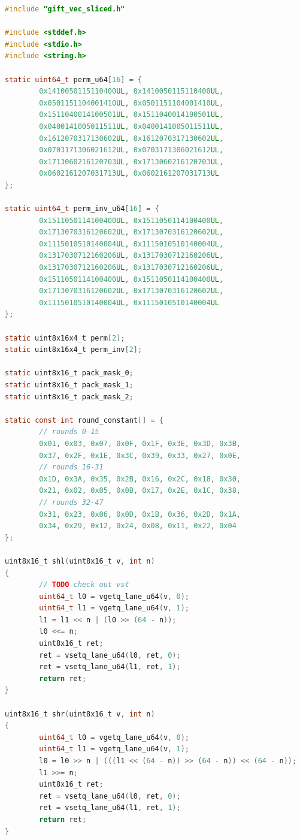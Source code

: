 \documentclass[12pt]{report}
\begin{document}
\begin{lstlisting}[language=c, caption={gift\_vec\_sliced.c}]
#include "gift_vec_sliced.h"

#include <stddef.h>
#include <stdio.h>
#include <string.h>

static uint64_t perm_u64[16] = {
        0x1410050115110400UL, 0x1410050115110400UL,
        0x0501151104001410UL, 0x0501151104001410UL,
        0x1511040014100501UL, 0x1511040014100501UL,
        0x0400141005011511UL, 0x0400141005011511UL,
        0x1612070317130602UL, 0x1612070317130602UL,
        0x0703171306021612UL, 0x0703171306021612UL,
        0x1713060216120703UL, 0x1713060216120703UL,
        0x0602161207031713UL, 0x0602161207031713UL
};

static uint64_t perm_inv_u64[16] = {
        0x1511050114100400UL, 0x1511050114100400UL,
        0x1713070316120602UL, 0x1713070316120602UL,
        0x1115010510140004UL, 0x1115010510140004UL,
        0x1317030712160206UL, 0x1317030712160206UL,
        0x1317030712160206UL, 0x1317030712160206UL,
        0x1511050114100400UL, 0x1511050114100400UL,
        0x1713070316120602UL, 0x1713070316120602UL,
        0x1115010510140004UL, 0x1115010510140004UL
};

static uint8x16x4_t perm[2];
static uint8x16x4_t perm_inv[2];

static uint8x16_t pack_mask_0;
static uint8x16_t pack_mask_1;
static uint8x16_t pack_mask_2;

static const int round_constant[] = {
        // rounds 0-15
        0x01, 0x03, 0x07, 0x0F, 0x1F, 0x3E, 0x3D, 0x3B,
        0x37, 0x2F, 0x1E, 0x3C, 0x39, 0x33, 0x27, 0x0E,
        // rounds 16-31
        0x1D, 0x3A, 0x35, 0x2B, 0x16, 0x2C, 0x18, 0x30,
        0x21, 0x02, 0x05, 0x0B, 0x17, 0x2E, 0x1C, 0x38,
        // rounds 32-47
        0x31, 0x23, 0x06, 0x0D, 0x1B, 0x36, 0x2D, 0x1A,
        0x34, 0x29, 0x12, 0x24, 0x08, 0x11, 0x22, 0x04
};

uint8x16_t shl(uint8x16_t v, int n)
{
        // TODO check out vst
        uint64_t l0 = vgetq_lane_u64(v, 0);
        uint64_t l1 = vgetq_lane_u64(v, 1);
        l1 = l1 << n | (l0 >> (64 - n));
        l0 <<= n;
        uint8x16_t ret;
        ret = vsetq_lane_u64(l0, ret, 0);
        ret = vsetq_lane_u64(l1, ret, 1);
        return ret;
}

uint8x16_t shr(uint8x16_t v, int n)
{
        uint64_t l0 = vgetq_lane_u64(v, 0);
        uint64_t l1 = vgetq_lane_u64(v, 1);
        l0 = l0 >> n | (((l1 << (64 - n)) >> (64 - n)) << (64 - n));
        l1 >>= n;
        uint8x16_t ret;
        ret = vsetq_lane_u64(l0, ret, 0);
        ret = vsetq_lane_u64(l1, ret, 1);
        return ret;
}


\end{lstlisting}
\end{document}
